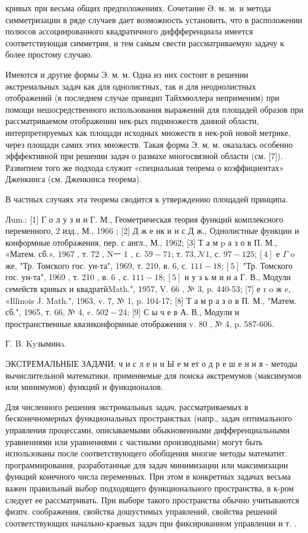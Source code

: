 \documentclass[10pt]{article}
\begin{document}
кривых при весьма общих предположениях. Сочетание Ә. м. м. и метода симметризации в ряде случаев дает возможность установить, что в расположении полюсов ассоциированного квадратичного диффференциала имеется соответствующая симметрия, и тем самым свести рассматриваемую задачу к более простому случаю.



Имеются и другие формы Э. м. м. Одна из них состоит в решении әкстремальных задач как для однолистных, так и для неоднолистных отображений (в последнем случае принцип Тайхмюллера неприменим) при помощи нешосредственного использования выражений для площадей образов при рассматриваемом отображении нек-рых подмножеств данной области, интерпретируемых как площади исходных множеств в нек-рой новой метрике, через площади самих этих множеств. Такая форма Э. м. м. оказалась особенно эфффективной при решении задач о размахе многосвязной области (см. [7]). Развитием того же подхода служит «специальная теорема о коэффициентах» Дженкинса (см. Дженкинса теорема).



В частных случаях эта теорема сводится к утверждению площадей принципа.



Лum.: [1] Г о л у з и н Г. М., Геометрическая теория функций комплексного переменного, 2 изд., М., 1966 ; [2] Д ж е нк и н с Д ж., Однолистные функции и конформные отображения, пер. с англ., М., 1962; [3] Т а м p а з о в П. М., «Матем. сб.», 1967 , т. 72 , Nㅡ 1 , с. $59-71$; т. $73, \mathcal{N} 1$, с. $97-125 ;[4]$ е $\Gamma$ o же, "Тр. Томского гос. ун-та", 1969, т. 210, в. 6, с. $111-18 ;[5]$ "Тр. Томского гос. ун-та", 1969 , т. 210 , в. 6 , с. $111-18 ;[5]$ н у з ь м и н а Г. В., Модули семейств кривых и квадратйMath.", 1957, V. 66 , № 3, p. 440-53; [7] е r o ж e, «Illinois J. Math.", 1963, v. 7, № 1, p. 104-17; [8] Т а м р а з о в П. М., "Матем. сб.", 1965, т. 66, № 4, c. $502-24$; [9] С ы ч е в А. В., Модули и пространственные квазиконформные отображения v. 80 , № 4, p. 587-606.

Г. B. Kyзыминa.



ЭКСТРЕМАЛЬНБІЕ ЗАДАЧИ; ч и с л е н н Ы е м ет о д р е ш е н и я - методы вычислительной математики, применяемые для поиска әкстремумов (максимумов или минимумов) функций и функционалов.



Для численного решения экстрөмальных задач, рассматриваемых в бесконечномерных функциональных пространствах (напр., задач оптимального управления процессами, описываемыми обыкновенными дифференциальными уравнениями или уравнениями с частными производными) могут быть использованы после соответствующего обобщения многие методы математит. программирования, разработанные для задач минимизации или максимизации функций конечного числа переменных. При этом в конкретных задачах весьма важен правильный выбор подходящего функционального пространства, в к-ром следует ее рассматривать. При выборе такого пространства обычно учитываются физпч. соображения, свойства дошустимых управлений, свойства решений соответствующих начально-краевых задач при фиксированном управлении и т. .
\end{document}
